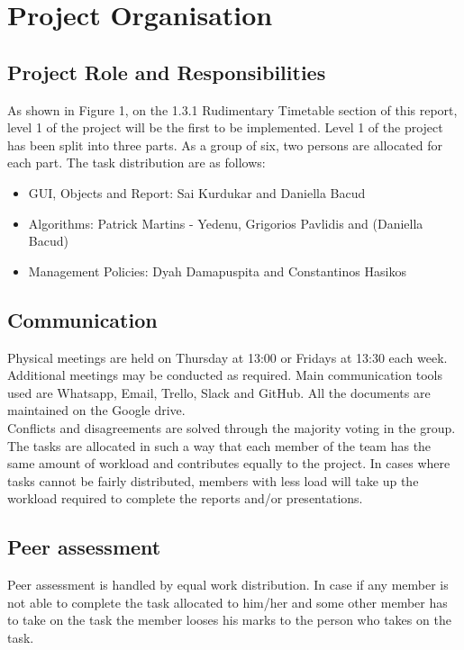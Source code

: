 \documentclass{article} \usepackage{graphicx}
\begin{document}
	\section{Project Organisation}
        \subsection{Project Role and Responsibilities}
            As shown in Figure 1, on the 1.3.1 Rudimentary Timetable section of this 
            report, level 1 of the project will be the first to be implemented. Level 
            1 of the project has been split into three parts. As a group of six, two
             persons are allocated for each part. The task distribution are as follows: 			
            \begin{itemize}
                \item GUI, Objects and Report: Sai Kurdukar and Daniella Bacud
                \item Algorithms: Patrick Martins - Yedenu, Grigorios Pavlidis and (Daniella Bacud)
                \item Management Policies: Dyah Damapuspita and Constantinos Hasikos
            \end{itemize}
        \subsection{Communication}
            Physical meetings are held on Thursday at 13:00 or Fridays at 13:30 each week. 
            Additional meetings may be conducted as required. Main communication tools used are Whatsapp, Email, Trello, Slack and GitHub. 
            All the documents are maintained on the Google drive.
            \\Conflicts and disagreements are solved through the majority voting in the group.
            \\The tasks are allocated in such a way that each member of the team has the same amount of workload and contributes equally
              to the project. In cases where tasks cannot be fairly distributed, members with less load will take up the workload required
              to complete the reports and/or presentations. 
          \subsection{Peer assessment}
          Peer assessment is handled by equal work distribution. In case if any member is not able to complete the task allocated to him/her and some other 		  member has to take on the task the member looses his marks to the person who takes on the task.
               		
\end{document}
